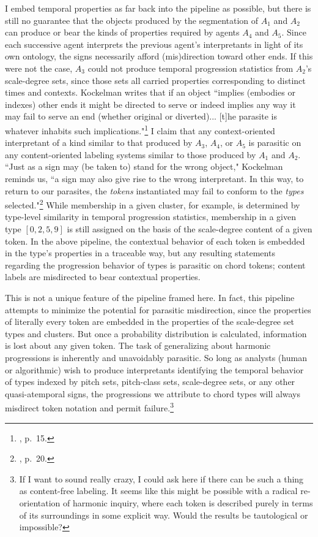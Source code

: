 I embed temporal properties as far back into the pipeline as possible, but there is still no guarantee that the objects produced by the segmentation of $A_1$ and $A_2$ can produce or bear the kinds of properties required by agents $A_4$ and $A_5$.  Since each successive agent interprets the previous agent's interpretants in light of its own ontology, the signs necessarily afford (mis)direction toward other ends.  If this were not the case, $A_3$ could not produce temporal progression statistics from $A_2$'s scale-degree sets, since those sets all carried properties corresponding to distinct times and contexts.  Kockelman writes that if an object ``implies (embodies or indexes) other ends it might be directed to serve or indeed implies any way it may fail to serve an end (whether original or diverted)... [t]he parasite is whatever inhabits such implications."\footnote{\cite{kockelman2013}, p.\ 15.}  I claim that any context-oriented interpretant of a kind similar to that produced by $A_3$, $A_4$, or $A_5$ is parasitic on any content-oriented labeling systems similar to those produced by $A_1$ and $A_2$.  ``Just as a sign may (be taken to) stand for the wrong object," Kockelman reminds us, ``a  sign may also give rise to the wrong interpretant.  In this way, to return to our parasites, the \emph{tokens} instantiated may fail to conform to the \emph{types} selected."\footnote{\cite{kockelman2013}, p.\ 20.}  While membership in a given cluster, for example, is determined by type-level similarity in temporal progression statistics, membership in a given type $[0,2,5,9]$ is still assigned on the basis of the scale-degree content of a given token.  In the above pipeline, the contextual behavior of each token is embedded in the type's properties in a traceable way, but any resulting statements regarding the progression behavior of types is parasitic on chord tokens; content labels are misdirected to bear contextual properties.

This is not a unique feature of the pipeline framed here.  In fact, this pipeline attempts to minimize the potential for parasitic misdirection, since the properties of literally every token are embedded in the properties of the scale-degree set types and clusters.  But once a probability distribution is calculated, information is lost about any given token.  The task of generalizing about harmonic progressions is inherently and unavoidably parasitic. So long as analysts (human or algorithmic) wish to produce interpretants identifying the temporal behavior of types indexed by pitch sets, pitch-class sets, scale-degree sets, or any other quasi-atemporal signs, the progressions we attribute to chord types will always misdirect token notation and permit failure.\footnote{If I want to sound really crazy, I could ask here if there can be such a thing as content-free labeling.  It seems like this might be possible with a radical re-orientation of harmonic inquiry, where each token is described purely in terms of its surroundings in some explicit way.  Would the results be tautological or impossible?}


